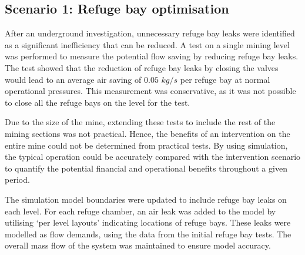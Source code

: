 	\subsection{Scenario 1: Refuge bay optimisation}
	After an underground investigation, unnecessary refuge bay leaks were identified as a significant inefficiency that can be reduced. A test on a single mining level was performed to measure the potential flow saving by reducing refuge bay leaks. The test showed that the reduction of refuge bay leaks by closing the valves would lead to an average air saving of $0.05$ $kg/s$ per refuge bay at normal operational pressures. This measurement was conservative, as it was not possible to close all the refuge bays on the level for the test. 
	\par 
	Due to the size of the mine, extending these tests to include the rest of the mining sections was not practical.  Hence, the benefits of an intervention on the entire mine could not be determined from practical tests. By using simulation, the typical operation could be accurately compared with the intervention scenario to quantify the potential financial and operational benefits throughout a given period.
	\par
	The simulation model boundaries were updated to include refuge bay leaks on each level. For each refuge chamber, an air leak was added to the model by utilising \enquote*{per level layouts} indicating locations of refuge bays. These leaks were modelled as flow demands, using the data from the initial refuge bay tests. The overall mass flow of the system was maintained to ensure model accuracy. 
